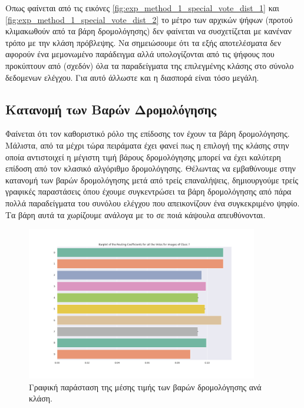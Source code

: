 Οπως φαίνεται από τις εικόνες \ref{fig:exp_method_1_special_vote_dist_1} και \ref{fig:exp_method_1_special_vote_dist_2} το μέτρο των αρχικών ψήφων (προτού κλιμακωθούν από τα βάρη δρομολόγησης) δεν φαίνεται να συσχετίζεται με κανέναν τρόπο με την κλάση πρόβλεψης. Να σημειώσουμε ότι τα εξής αποτελέσματα δεν αφορούν ένα μεμονωμένο παράδειγμα αλλά υπολογίζονται από τις ψήφους που προκύπτουν από (σχεδόν) όλα τα παραδείγματα της επιλεγμένης κλάσης στο σύνολο δεδομενων ελέγχου. Για αυτό άλλωστε και η διασπορά είναι τόσο μεγάλη.

\subsection{Κατανομή των Βαρών Δρομολόγησης}
Φαίνεται ότι τον καθοριστικό ρόλο της επίδοσης τον έχουν τα βάρη δρομολόγησης. Μάλιστα, από τα μέχρι τώρα πειράματα έχει φανεί πως η επιλογή της κλάσης στην οποία αντιστοιχεί η μέγιστη τιμή βάρους δρομολόγησης μπορεί να έχει καλύτερη επίδοση από τον κλασικό αλγόριθμο δρομολόγησης. Θέλωντας να εμβαθύνουμε στην κατανομή των βαρών δρομολόγησης μετά από τρείς επαναλήψεις, δημιουργούμε τρείς γραφικές παραστάσεις όπου έχουμε συγκεντρώσει τα βάρη δρομολόγησης από πάρα πολλά παραδείγματα του συνόλου ελέγχου που απεικονίζουν ένα συγκεκριμένο ψηφίο. Τα βάρη αυτά τα χωρίζουμε ανάλογα με το σε ποιά κάψουλα  απευθύνονται.\par
\begin{figure}[h]
    \centering
    \includegraphics[width=0.9\textwidth]{images/chapter experiments/method 1/image 13/barplot_for_class_7.png}
    \caption{Γραφική παράσταση της μέσης τιμής των βαρών δρομολόγησης ανά κλάση.}
    \label{fig:exp_method_1_special_weight_dist_1}
  \end{figure}

